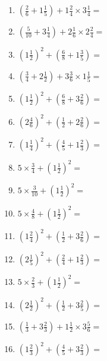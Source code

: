 \documentclass[12pt]{article}
\begin{document}
\begin{enumerate}
\item \large $ (\frac{2}{6} + 1 \frac{1}{5}) + 1 \frac{2}{4} \times 3 \frac{1}{4} = $ \vspace{1.8cm}
\item \large $ (\frac{5}{10} + 3 \frac{1}{4}) + 2 \frac{1}{6} \times 2 \frac{2}{4} = $ \vspace{1.8cm}
\item \large $ (1 \frac{1}{2})^2 + (\frac{6}{8} + 1 \frac{3}{5}) = $ \vspace{1.8cm}
\item \large $ (\frac{3}{4} + 2 \frac{1}{2}) + 3 \frac{3}{6} \times 1 \frac{1}{5} = $ \vspace{1.8cm}
\item \large $ (1 \frac{1}{2})^2 + (\frac{6}{8} + 3 \frac{2}{6}) = $ \vspace{1.8cm}
\item \large $ (2 \frac{4}{6})^2 + (\frac{1}{2} + 2 \frac{2}{6}) = $ \vspace{1.8cm}
\newpage
\item \large $ (1 \frac{1}{4})^2 + (\frac{4}{5} + 1 \frac{2}{3}) = $ \vspace{1.8cm}
\item \large $ 5 \times \frac{3}{4} + (1 \frac{1}{2})^2 = $ \vspace{1.8cm}
\item \large $ 5 \times \frac{3}{10} + (1 \frac{1}{2})^2 = $ \vspace{1.8cm}
\item \large $ 5 \times \frac{4}{8} + (1 \frac{1}{2})^2 = $ \vspace{1.8cm}
\item \large $ (1 \frac{2}{4})^2 + (\frac{1}{2} + 3 \frac{2}{6}) = $ \vspace{1.8cm}
\item \large $ (2 \frac{1}{5})^2 + (\frac{2}{4} + 1 \frac{2}{3}) = $ \vspace{1.8cm}
\item \large $ 5 \times \frac{2}{3} + (1 \frac{1}{2})^2 = $ \vspace{1.8cm}
\item \large $ (2 \frac{1}{2})^2 + (\frac{1}{2} + 3 \frac{2}{5}) = $ \vspace{1.8cm}
\item \large $ (\frac{1}{3} + 3 \frac{2}{3}) + 1 \frac{1}{2} \times 3 \frac{5}{6} = $ \vspace{1.8cm}
\item \large $ (1 \frac{2}{3})^2 + (\frac{4}{5} + 3 \frac{2}{3}) = $ \vspace{1.8cm}

\end{enumerate}
\end{document}
